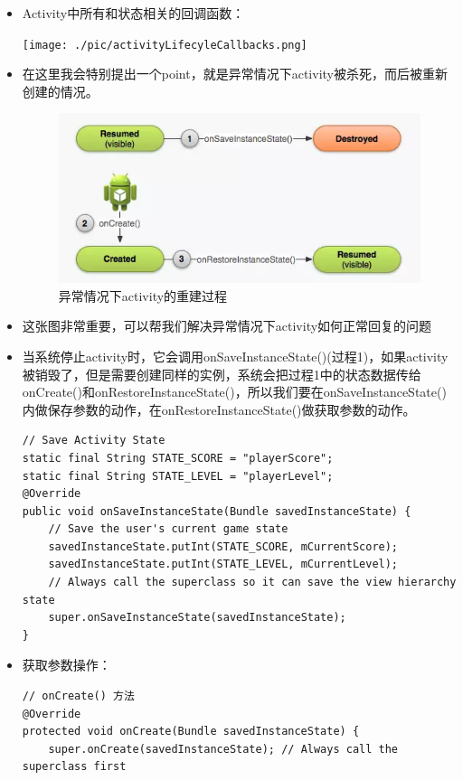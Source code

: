 \documentclass[9pt, b5paper]{article}
\begin{document}
\begin{itemize}
\item Activity中所有和状态相关的回调函数：

\texttt{[image: ./pic/activityLifecyleCallbacks.png]}
\item 在这里我会特别提出一个point，就是异常情况下activity被杀死，而后被重新创建的情况。

\begin{figure}[htb]
\centering
\includegraphics[width=.9\linewidth]{./pic/recreateActivity.png}
\caption{异常情况下activity的重建过程}
\end{figure}

\item 这张图非常重要，可以帮我们解决异常情况下activity如何正常回复的问题
\item 当系统停止activity时，它会调用onSaveInstanceState()(过程1)，如果activity被销毁了，但是需要创建同样的实例，系统会把过程1中的状态数据传给onCreate()和onRestoreInstanceState()，所以我们要在onSaveInstanceState()内做保存参数的动作，在onRestoreInstanceState()做获取参数的动作。
\begin{verbatim}
// Save Activity State
static final String STATE_SCORE = "playerScore";
static final String STATE_LEVEL = "playerLevel";
@Override
public void onSaveInstanceState(Bundle savedInstanceState) {
    // Save the user's current game state
    savedInstanceState.putInt(STATE_SCORE, mCurrentScore);
    savedInstanceState.putInt(STATE_LEVEL, mCurrentLevel);
    // Always call the superclass so it can save the view hierarchy state
    super.onSaveInstanceState(savedInstanceState);
}
\end{verbatim}
\item 获取参数操作：
\begin{verbatim}
// onCreate() 方法
@Override
protected void onCreate(Bundle savedInstanceState) {
    super.onCreate(savedInstanceState); // Always call the superclass first


\end{verbatim}
\end{itemize}
\end{document}
